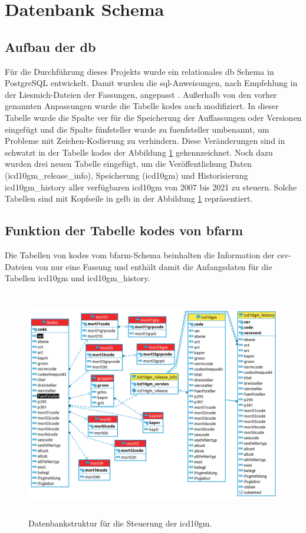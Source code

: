\section{Datenbank Schema} \label{database}

\subsection{Aufbau der \acl{db}} \label{dbdevelop}

Für die Durchführung dieses Projekts wurde ein relationales \ac{db} Schema in PostgreSQL entwickelt. Damit wurden die \ac{sql}-Anweisungen, nach Empfehlung in der Liesmich-Dateien der Fassungen, angepasst \cite{readmel}. Außerhalb von den vorher genannten Anpassungen wurde die Tabelle \textsf{kodes} auch modifiziert. In dieser Tabelle wurde die Spalte \textsf{ver} für die Speicherung der Auffassungen oder Versionen eingefügt und die Spalte \textsf{fünfsteller} wurde zu \textsf{fuenfsteller} umbenannt, um Probleme mit Zeichen-Kodierung zu verhindern. Diese Veränderungen sind in schwatzt in der Tabelle \textsf{kodes} der Abbildung \ref{fig:reldb2} gekennzeichnet. Noch dazu wurden drei neuen Tabelle eingefügt, um die Veröffentlichung Daten (\textsf{icd10gm\_release\_info}), Speicherung (\textsf{icd10gm}) und Historisierung \textsf{icd10gm\_history} aller verfügbaren \ac{icd10gm} von 2007 bis 2021 zu steuern. Solche Tabellen sind mit Kopfseile in gelb in der Abbildung \ref{fig:reldb2} repräsentiert.

\subsection{Funktion der Tabelle \textsf{kodes} von \acs{bfarm}} \label{bfarmtables}

Die Tabellen von \textsf{kodes} vom \ac{bfarm}-Schema beinhalten die Information der \ac{csv}-Dateien von nur eine Fassung und enthält damit die Anfangsdaten für die Tabellen \textsf{icd10gm} und \textsf{icd10gm\_history}.

\clearpage	
\begin{figure}[ht]
	\centering
	\includegraphics[height=10cm]{figures/icdSqlSchema}
	\caption[Datenbankstruktur]{Datenbankstruktur für die Steuerung der \ac{icd10gm}.}
	\label{fig:reldb2}
\end{figure}

